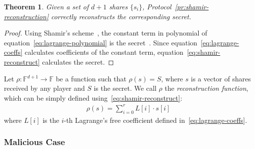 \documentclass[10pt]{article}
\newtheorem{theorem}{Theorem}
\theoremstyle{plain}
\begin{document}
\begin{theorem}
	Given a set of $d+1$ shares $\{s_{i}\}$, Protocol~\ref{pr:shamir-reconstruction}
	correctly reconstructs the corresponding secret. 
\end{theorem}
\begin{proof}
	Using Shamir's scheme~\cite{shamir:how}, the constant term in polynomial
	of equation~\eqref{eq:lagrange-polynomial} is the secret~\cite{Huang:2010:URL}.
	Since equation~\eqref{eq:lagrange-coeffs} calculates coefficients
	of the constant term, equation~\eqref{eq:shamir-reconstruct} calculates
	the secret. 
\end{proof}
Let $\rho:\mathbb{F}{}^{d+1}\to\mathbb{F}$ be a function such that
$\rho(s)=S$, where $s$ is a vector of shares received by any player
and $S$ is the secret. We call $\rho$ the \emph{reconstruction function},
which can be simply defined using~\eqref{eq:shamir-reconstruct}:
\begin{align}
\rho(s)=\sum_{i=0}^{r}L[i]\cdot s[i]
\end{align}
where $L[i]$ is the $i$-th Lagrange's free coefficient defined in~\eqref{eq:lagrange-coeffs}.



\subsubsection{Malicious Case}
\end{document}
